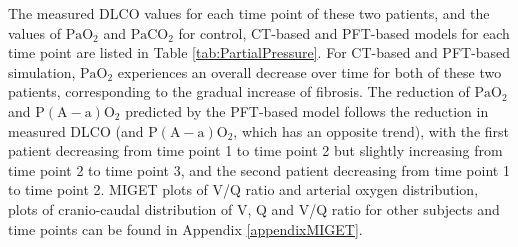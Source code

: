 The measured DLCO values for each time point of these two patients, and the values of $\mathrm{PaO_2}$ and $\mathrm{PaCO_2}$ for control, CT-based and PFT-based models for each time point are listed in Table \ref{tab:PartialPressure}. For CT-based and PFT-based simulation, $\mathrm{PaO_2}$ experiences an overall decrease over time for both of these two patients, corresponding to the gradual increase of fibrosis. The reduction of $\mathrm{PaO_2}$ and $\mathrm{P(A-a)O_2}$ predicted by the PFT-based model follows the reduction in measured DLCO (and $\mathrm{P(A-a)O_2}$, which has an opposite trend), with the first patient decreasing from time point 1 to time point 2 but slightly increasing from time point 2 to time point 3, and the second patient decreasing from time point 1 to time point 2. MIGET plots of V/Q ratio and arterial oxygen distribution, plots of cranio-caudal distribution of V, Q and V/Q ratio for other subjects and time points can be found in Appendix \ref{appendixMIGET}.

